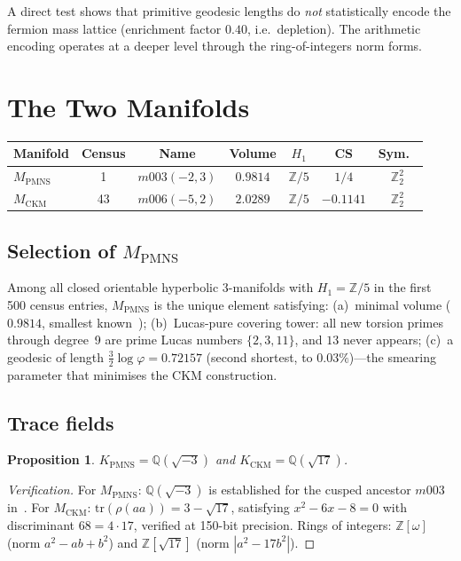 \documentclass[11pt,a4paper]{article}
\newtheorem{proposition}[theorem]{Proposition}
\theoremstyle{definition}
\theoremstyle{remark}
\newcommand{\Zfive}{\mathbb{Z}/5}
\newcommand{\MPMNS}{M_{\mathrm{PMNS}}}
\newcommand{\MCKM}{M_{\mathrm{CKM}}}
\newcommand{\KPMNS}{K_{\mathrm{PMNS}}}
\newcommand{\KCKM}{K_{\mathrm{CKM}}}
\newcommand{\Zom}{\mathbb{Z}[\omega]}
\newcommand{\Zsev}{\mathbb{Z}[\sqrt{17}]}
\newcommand{\vp}{\varphi}
\begin{document}
A direct test shows that primitive geodesic lengths do \emph{not}
statistically encode the fermion mass lattice (enrichment factor $0.40$,
i.e.\ depletion). The arithmetic encoding operates at a deeper level
through the ring-of-integers norm forms.

\section{The Two Manifolds}
\label{sec:manifolds}

\begin{center}
\begin{tabular}{lcccccc}
\toprule
Manifold & Census & Name & Volume & $H_1$ & CS & Sym.\ \\
\midrule
$\MPMNS$ & 1  & $m003(-2,3)$ & $0.9814$ & $\Zfive$ & $1/4$      & $\mathbb{Z}_2^2$ \\
$\MCKM$  & 43 & $m006(-5,2)$ & $2.0289$ & $\Zfive$ & $-0.1141$ & $\mathbb{Z}_2^2$ \\
\bottomrule
\end{tabular}
\end{center}

\subsection{Selection of $\MPMNS$}

Among all closed orientable hyperbolic 3-manifolds with
$H_1=\Zfive$ in the first 500 census entries, $\MPMNS$ is the unique
element satisfying:
(a)~minimal volume ($0.9814$, smallest known~\cite{GMM});
(b)~Lucas-pure covering tower: all new torsion primes through degree~9
are prime Lucas numbers $\{2,3,11\}$, and $13$ never appears;
(c)~a geodesic of length $\frac{3}{2}\log\vp=0.72157$ (second shortest,
to $0.03\%$)---the smearing parameter that minimises the CKM construction.

\subsection{Trace fields}

\begin{proposition}
$\KPMNS = \mathbb{Q}(\sqrt{-3})$ and $\KCKM = \mathbb{Q}(\sqrt{17})$.
\end{proposition}
\begin{proof}[Verification]
For $\MPMNS$: $\mathbb{Q}(\sqrt{-3})$ is established for the cusped
ancestor $m003$ in~\cite{Chinburg98}.
For $\MCKM$: $\mathrm{tr}(\rho(aa))=3-\sqrt{17}$, satisfying
$x^2-6x-8=0$ with discriminant $68=4\cdot17$, verified at 150-bit
precision. Rings of integers: $\Zom$ (norm $a^2-ab+b^2$) and
$\Zsev$ (norm $|a^2-17b^2|$).
\end{proof}
\end{document}
